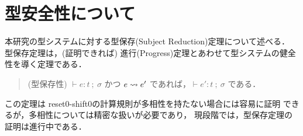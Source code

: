 \section{型安全性について}

本研究の型システムに対する型保存(Subject Reduction)定理について述べる．
型保存定理は，(証明できれば)
進行(Progress)定理とあわせて型システムの健全性を導く定理である．

\begin{quote}
  (型保存性)
  $\vdash e:t~;~\sigma$ かつ $e \leadsto e'$ であれば，$\vdash e':t~;~\sigma$
  である．
\end{quote}

この定理は reset0-shift0の計算規則が多相性を持たない場合には容易に証明
できるが，多相性については精密な扱いが必要であり，
現段階では，型保存定理の証明は進行中である．


